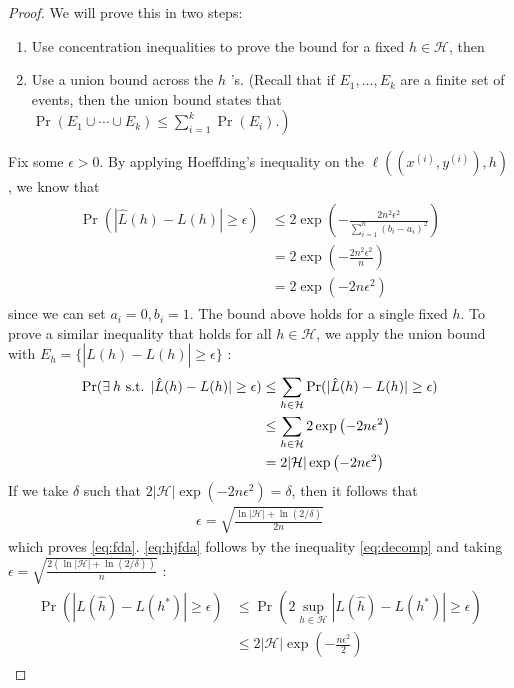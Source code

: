 \documentclass{article}
\begin{document}
\begin{proof}
 We will prove this in two steps:
 \begin{enumerate}
     \item Use concentration inequalities to prove the bound for a fixed $h \in \mathcal{H}$, then
     \item Use a union bound across the $h$ 's. (Recall that if $E_{1}, \ldots, E_{k}$ are a finite set of events, then the union bound states that $\left.\operatorname{Pr}\left(E_{1} \cup \cdots \cup E_{k}\right) \leq \sum_{i=1}^{k} \operatorname{Pr}\left(E_{i}\right) .\right)$
 \end{enumerate}
Fix some $\epsilon>0 .$ By applying Hoeffding's inequality on the $\ell\left(\left(x^{(i)}, y^{(i)}\right), h\right)$, we know that
\begin{align*}
\begin{aligned}
\operatorname{Pr}(|\hat{L}(h)-L(h)| \geq \epsilon) & \leq 2 \exp \left(-\frac{2 n^{2} \epsilon^{2}}{\sum_{i=1}^{n}\left(b_{i}-a_{i}\right)^{2}}\right) \\
&=2 \exp \left(-\frac{2 n^{2} \epsilon^{2}}{n}\right) \\
&=2 \exp \left(-2 n \epsilon^{2}\right)
\end{aligned}
\end{align*}
since we can set $a_{i}=0, b_{i}=1$. The bound above holds for a single fixed $h$. To prove a similar inequality that holds for all $h \in \mathcal{H}$, we apply the union bound with $E_{h}=\{|\hat{L}(h)-L(h)| \geq \epsilon\}$ :
\begin{align}
\operatorname{Pr}(\exists h \text { s.t. }|\hat{L}(h)-L(h)| \geq \epsilon) & \leq \sum_{h \in \mathcal{H}} \operatorname{Pr}(|\hat{L}(h)-L(h)| \geq \epsilon) \nn
& \leq \sum_{h \in \mathcal{H}} 2 \exp \left(-2 n \epsilon^{2}\right) \nn
&=2|\mathcal{H}| \exp \left(-2 n \epsilon^{2}\right)\label{eq:hfdafe}
\end{align}
If we take $\delta$ such that $2|\mathcal{H}| \exp \left(-2 n \epsilon^{2}\right)=\delta$, then it follows that
\begin{align*}
\epsilon=\sqrt{\frac{\ln |\mathcal{H}|+\ln (2 / \delta)}{2 n}}
\end{align*}
which proves \cref{eq:fda}. \cref{eq:hjfda} follows by the inequality \cref{eq:decomp} and taking $\epsilon=\sqrt{\frac{2(\ln |\mathcal{H}|+\ln (2 / \delta))}{n}}$ :
\begin{align*}
\begin{aligned}
\operatorname{Pr}\left(\left|L(\hat{h})-L\left(h^{*}\right)\right| \geq \epsilon\right) & \leq \operatorname{Pr}\left(2 \sup _{h \in \mathcal{H}}\left|L(\hat{h})-L\left(h^{*}\right)\right| \geq \epsilon\right) \\
& \leq 2|\mathcal{H}| \exp \left(-\frac{n \epsilon^{2}}{2}\right)
\end{aligned}
\end{align*}
\end{proof}
\end{document}
